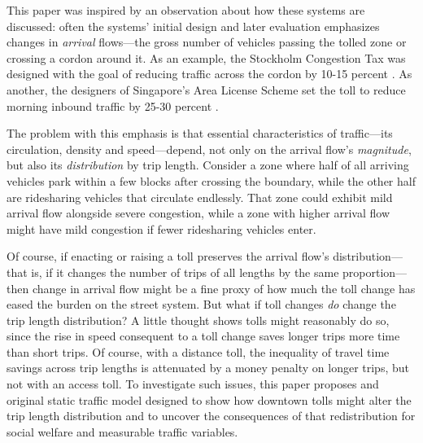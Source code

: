 \documentclass[preprint,authoryear]{elsarticle}
\begin{document}
This paper was inspired by an observation about how these systems are discussed: often the systems' initial design and later evaluation emphasizes changes in \emph{arrival} flows---the gross number of vehicles passing the tolled zone or crossing a cordon around it. As an example, the Stockholm Congestion Tax was designed with the goal of reducing traffic across the cordon by 10-15 percent \citep[p.396]{Eliasson2008}. As another, the designers of Singapore's Area License Scheme set the toll to reduce morning inbound traffic by 25-30 percent \citep[p. 12]{WatsonHolland1978}. 

The problem with this emphasis is that essential characteristics of traffic---its circulation, density and speed---depend, not only on the arrival flow's \emph{magnitude}, but also its \emph{distribution} by trip length. Consider a zone where half of all arriving vehicles park within a few blocks after crossing the boundary, while the other half are ridesharing vehicles that circulate endlessly. That zone could exhibit mild arrival flow alongside severe congestion, while a zone with higher arrival flow might have mild congestion if fewer ridesharing vehicles enter.

Of course, if enacting or raising a toll preserves the arrival flow's  distribution---that is, if it changes the number of trips of all lengths by the same proportion---then change in arrival flow might  be a fine proxy of how much the toll change has eased the burden on the street system. But what if toll changes \emph{do} change the trip length distribution? A little thought shows tolls might reasonably do so, since the rise in speed consequent to a toll change saves longer trips more time than short trips. Of course, with a distance toll, the inequality of travel time savings across trip lengths is attenuated by a money penalty on longer trips, but not with an access toll. To investigate such issues, this paper proposes and original static traffic model designed to show how downtown tolls might alter the trip length distribution and to uncover the consequences of that redistribution for social welfare and measurable traffic variables.
\end{document}
